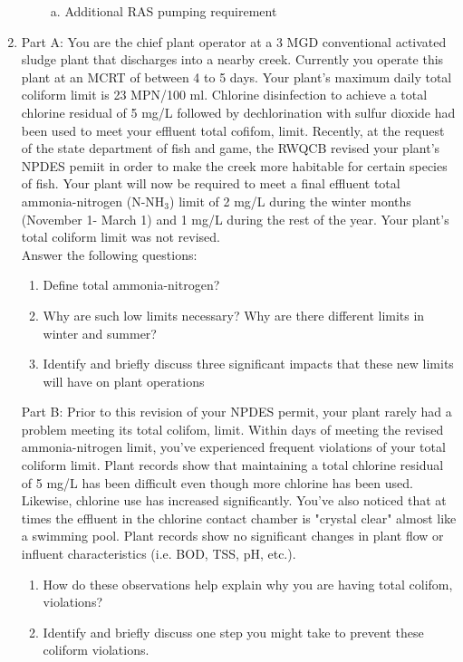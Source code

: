 \begin{enumerate}
\begin{enumerate}[1.]
\begin{enumerate}[a).]
\item Additional RAS pumping requirement
\end{enumerate}
\end{enumerate}
\newpage
\item Part A:  You are the chief plant operator at a 3 MGD conventional activated sludge plant that discharges into a nearby creek. Currently you operate this plant at an MCRT of between 4 to 5 days. Your plant’s maximum daily total coliform limit is 23 MPN/100 ml. Chlorine disinfection to achieve a total chlorine residual of 5 mg/L followed by dechlorination with sulfur dioxide had been used to meet your effluent total cofifom, limit. Recently, at the request of the state department of fish and game, the RWQCB revised your plant’s NPDES pemiit in order to make the creek more habitable for certain species of fish.  Your plant will now be required to meet a final effluent total ammonia-nitrogen (N-NH$_3$) limit of 2 mg/L during the winter months (November 1- March 1) and 1 mg/L during the rest of the year. Your plant’s total coliform limit was not revised.\\

Answer the following questions:
\begin{enumerate}
\item Define  total ammonia-nitrogen?
\item Why are such low limits necessary? Why are there different limits in winter and summer?
\item Identify and briefly discuss three significant impacts that these new limits will have on plant operations
\end{enumerate}

Part B:  Prior to this revision of your NPDES permit, your plant rarely had a problem meeting its total colifom, limit. Within days of meeting the revised ammonia-nitrogen limit, you’ve experienced frequent violations of your total coliform limit. Plant records show that maintaining a total chlorine residual of 5 mg/L has been difficult even though more chlorine has been used. Likewise, chlorine use has increased significantly. You’ve also noticed that at times the effluent in the chlorine contact chamber is "crystal clear" almost like a swimming pool. Plant records show no significant changes in plant flow or influent characteristics (i.e.  BOD, TSS, pH, etc.).  \begin{enumerate}
\item How do these observations help explain why you are having total colifom, violations?
\item Identify and briefly discuss one step you might take to prevent these coliform violations.
\end{enumerate}


\end{enumerate}
